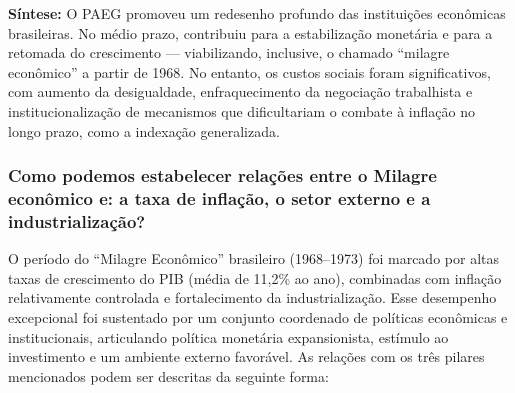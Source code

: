 \documentclass[a4paper,12pt]{article}[abntex2]
\begin{document}
\textbf{Síntese:} O PAEG promoveu um redesenho profundo das instituições econômicas brasileiras. No médio prazo, contribuiu para a estabilização monetária e para a retomada do crescimento — viabilizando, inclusive, o chamado “milagre econômico” a partir de 1968. No entanto, os custos sociais foram significativos, com aumento da desigualdade, enfraquecimento da negociação trabalhista e institucionalização de mecanismos que dificultariam o combate à inflação no longo prazo, como a indexação generalizada.

\subsubsection{\textbf{Como podemos estabelecer relações entre o Milagre econômico e: a taxa de inflação, o setor externo e a industrialização?}}

O período do “Milagre Econômico” brasileiro (1968–1973) foi marcado por altas taxas de crescimento do PIB (média de 11,2\% ao ano), combinadas com inflação relativamente controlada e fortalecimento da industrialização. Esse desempenho excepcional foi sustentado por um conjunto coordenado de políticas econômicas e institucionais, articulando política monetária expansionista, estímulo ao investimento e um ambiente externo favorável. As relações com os três pilares mencionados podem ser descritas da seguinte forma:
\end{document}
